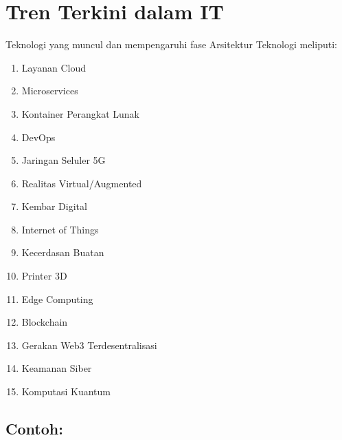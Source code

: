 \section{Tren Terkini dalam IT}
Teknologi yang muncul dan mempengaruhi fase Arsitektur Teknologi meliputi:
\begin{enumerate}
	\item Layanan Cloud
	\item Microservices
	\item Kontainer Perangkat Lunak
	\item DevOps
	\item Jaringan Seluler 5G
	\item Realitas Virtual/Augmented
	\item Kembar Digital
	\item Internet of Things
	\item Kecerdasan Buatan
	\item Printer 3D
	\item Edge Computing
	\item Blockchain
	\item Gerakan Web3 Terdesentralisasi
	\item Keamanan Siber
	\item Komputasi Kuantum
\end{enumerate}

\subsection*{Contoh:}

